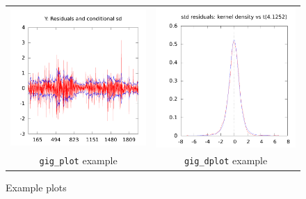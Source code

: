 \documentclass[a4paper,11pt]{article}
\begin{document}
\begin{figure}[htbp]
  \centering
  \begin{tabular}{cc}
    \includegraphics[scale=0.5]{graphs/plot_ex} &
    \includegraphics[scale=0.5]{graphs/dplot_ex} \\
    \texttt{gig\_plot} example &
    \texttt{gig\_dplot} example 
  \end{tabular}
  \caption{Example plots}
  \label{fig:ex-plots}
\end{figure}
\end{document}
